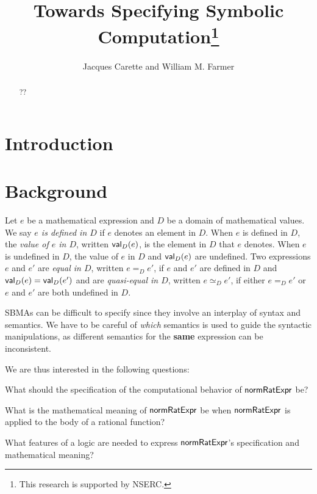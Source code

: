 \documentclass[fleqn]{llncs}
\title{Towards Specifying Symbolic Computation\thanks{This research is
    supported by NSERC.}}
\author{Jacques Carette and William M. Farmer}
\institute{%
Computing and Software, McMaster University, Canada\\
\url{http://www.cas.mcmaster.ca/~carette}\\
\url{http://imps.mcmaster.ca/wmfarmer}\\[1.5ex]
}
\newcommand{\NRE}{\ensuremath{\mname{normRatExpr}}}
\begin{document}
\maketitle

\begin{abstract}
??
\end{abstract}

\iffalse 

\textbf{Keywords:} ??

\fi

\section{Introduction}

\section{Background}

Let $e$ be a mathematical expression and $D$ be a domain of
mathematical values.  We say \emph{$e$ is defined in $D$} if $e$
denotes an element in $D$.  When $e$ is defined in $D$, the
\emph{value of $e$ in $D$}, written $\mbox{\sf val}_D(e)$, is the element
in $D$ that $e$ denotes.  When $e$ is undefined in $D$, the value of
$e$ in $D$ and $\mbox{\sf val}_D(e)$ are undefined.  Two expressions $e$
and $e'$ are \emph{equal in $D$}, written $e =_D e'$, if $e$ and $e'$
are defined in $D$ and $\mbox{\sf val}_D(e) = \mbox{\sf val}_D(e')$ and are
\emph{quasi-equal in $D$}, written $e \simeq_D e'$, if either $e =_D
e'$ or $e$ and $e'$ are both undefined in $D$.

\iffalse
SBMAs can be difficult to specify since they involve an interplay of
syntax and semantics.  We have to be careful of \emph{which} semantics
is used to guide the syntactic manipulations, as different semantics
for the \textbf{same} expression can be inconsistent.

We are thus interested in the following questions:

\be

  \item What should the specification of the computational behavior of
    {\NRE} be?

  \item What is the mathematical meaning of {\NRE} be when {\NRE} is
    applied to the body of a rational function?

  \item What features of a logic are needed to express
    {\NRE}'s specification and mathematical meaning?
\end{document}
